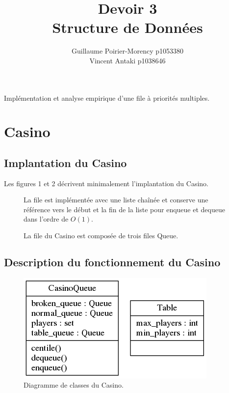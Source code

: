 \documentclass[french]{article}
\title{Devoir 3 \\Structure de Données}
\author{Guillaume Poirier-Morency p1053380 \\ Vincent Antaki p1038646}
\begin{document}
\maketitle

\abstract
Implémentation et analyse empirique d'une file à priorités multiples.

\section{Casino}

\subsection{Implantation du Casino}
Les figures 1 et 2 décrivent minimalement l'implantation du Casino.

\begin{figure}

\caption
{
  La file est implémentée avec une liste chaînée et conserve une référence vers
  le début et la fin de la liste pour \textsf{enqueue} et \textsf{dequeue} dans
  l'ordre de $O(1)$.
}
\end{figure}

\begin{figure}

\caption{La file du Casino est composée de trois files \textsf{Queue}.}
\end{figure}

\subsection{Description du fonctionnement du Casino}
\begin{figure}
  \centering
  \includegraphics[resolution=130]{figures/diagramme-casino.png}
  \caption{Diagramme de classes du Casino.}
\end{figure}
\end{document}
